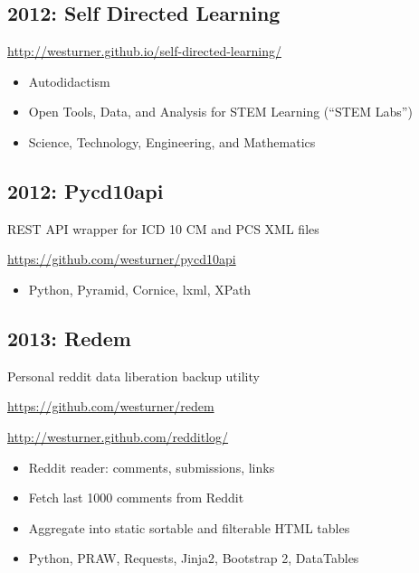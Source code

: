 \documentclass[letter,,openany,oneside]{sphinxhowto}
\begin{document}
\subsection{2012: Self Directed Learning}
\label{resume:self-directed-learning}
\begin{DUlineblock}{0em}
\item[] \href{http://westurner.github.io/self-directed-learning/}{http://westurner.github.io/self-directed-learning/}
\end{DUlineblock}
\begin{itemize}
\item {} 
Autodidactism

\item {} 
Open Tools, Data, and Analysis for STEM Learning (``STEM Labs'')

\item {} 
Science, Technology, Engineering, and Mathematics

\end{itemize}


\subsection{2012: Pycd10api}
\label{resume:pycd10api}
\begin{DUlineblock}{0em}
\item[] REST API wrapper for ICD 10 CM and PCS XML files
\item[] \href{https://github.com/westurner/pycd10api}{https://github.com/westurner/pycd10api}
\end{DUlineblock}
\begin{itemize}
\item {} 
Python, Pyramid, Cornice, lxml, XPath

\end{itemize}


\subsection{2013: Redem}
\label{resume:redem}
\begin{DUlineblock}{0em}
\item[] Personal reddit data liberation backup utility
\item[] \href{https://github.com/westurner/redem}{https://github.com/westurner/redem}
\item[] \href{http://westurner.github.com/redditlog/}{http://westurner.github.com/redditlog/}
\end{DUlineblock}
\begin{itemize}
\item {} 
Reddit reader: comments, submissions, links

\item {} 
Fetch last 1000 comments from Reddit

\item {} 
Aggregate into static sortable and filterable HTML tables

\item {} 
Python, PRAW, Requests, Jinja2, Bootstrap 2, DataTables

\end{itemize}
\end{document}
